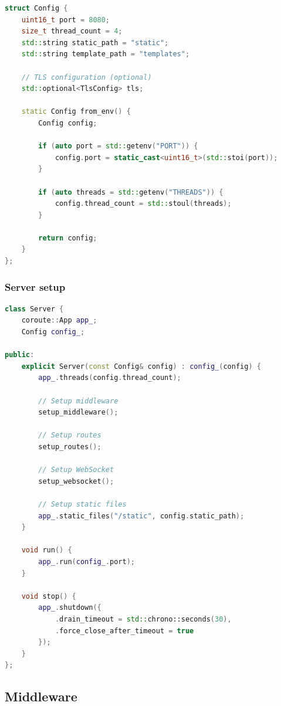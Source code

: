 \begin{lstlisting}[language=C++, basicstyle=\small\ttfamily, caption={Configuration class}]
struct Config {
    uint16_t port = 8080;
    size_t thread_count = 4;
    std::string static_path = "static";
    std::string template_path = "templates";
    
    // TLS configuration (optional)
    std::optional<TlsConfig> tls;
    
    static Config from_env() {
        Config config;
        
        if (auto port = std::getenv("PORT")) {
            config.port = static_cast<uint16_t>(std::stoi(port));
        }
        
        if (auto threads = std::getenv("THREADS")) {
            config.thread_count = std::stoul(threads);
        }
        
        return config;
    }
};
\end{lstlisting}

\subsubsection{Server setup}

\begin{lstlisting}[language=C++, basicstyle=\small\ttfamily, caption={Server initialization}]
class Server {
    coroute::App app_;
    Config config_;
    
public:
    explicit Server(const Config& config) : config_(config) {
        app_.threads(config.thread_count);
        
        // Setup middleware
        setup_middleware();
        
        // Setup routes
        setup_routes();
        
        // Setup WebSocket
        setup_websocket();
        
        // Setup static files
        app_.static_files("/static", config.static_path);
    }
    
    void run() {
        app_.run(config_.port);
    }
    
    void stop() {
        app_.shutdown({
            .drain_timeout = std::chrono::seconds(30),
            .force_close_after_timeout = true
        });
    }
};
\end{lstlisting}

\subsection{Middleware}

